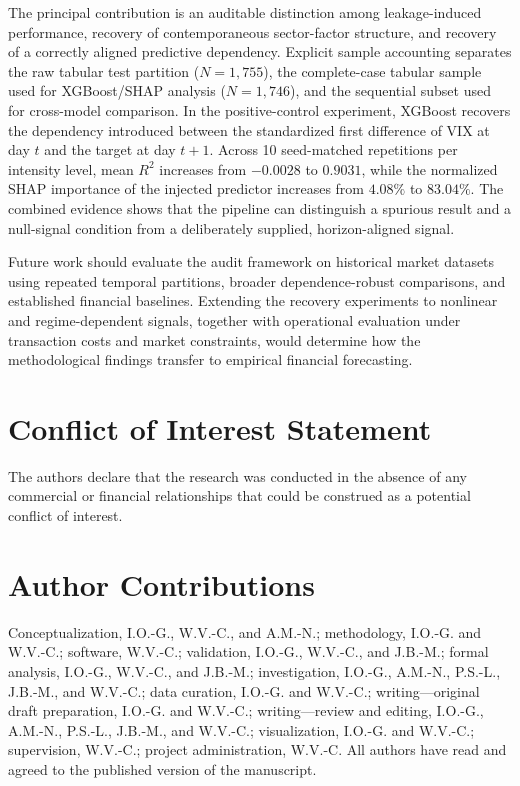 \documentclass[utf8]{FrontiersinHarvard} %
\begin{document}
The principal contribution is an auditable distinction among leakage-induced performance, recovery of contemporaneous sector-factor structure, and recovery of a correctly aligned predictive dependency. Explicit sample accounting separates the raw tabular test partition (\(N=1{,}755\)), the complete-case tabular sample used for XGBoost/SHAP analysis (\(N=1{,}746\)), and the sequential subset used for cross-model comparison. In the positive-control experiment, XGBoost recovers the dependency introduced between the standardized first difference of VIX at day \(t\) and the target at day \(t+1\). Across 10 seed-matched repetitions per intensity level, mean \(R^2\) increases from \(-0.0028\) to \(0.9031\), while the normalized SHAP importance of the injected predictor increases from \(4.08\%\) to \(83.04\%\). The combined evidence shows that the pipeline can distinguish a spurious result and a null-signal condition from a deliberately supplied, horizon-aligned signal.

Future work should evaluate the audit framework on historical market datasets using repeated temporal partitions, broader dependence-robust comparisons, and established financial baselines. Extending the recovery experiments to nonlinear and regime-dependent signals, together with operational evaluation under transaction costs and market constraints, would determine how the methodological findings transfer to empirical financial forecasting.

\section*{Conflict of Interest Statement}

The authors declare that the research was conducted in the absence of any commercial or financial relationships that could be construed as a potential conflict of interest.

\section*{Author Contributions}

Conceptualization, I.O.-G., W.V.-C., and A.M.-N.; methodology, I.O.-G. and W.V.-C.; software, W.V.-C.; validation, I.O.-G., W.V.-C., and J.B.-M.; formal analysis, I.O.-G., W.V.-C., and J.B.-M.; investigation, I.O.-G., A.M.-N., P.S.-L., J.B.-M., and W.V.-C.; data curation, I.O.-G. and W.V.-C.; writing---original draft preparation, I.O.-G. and W.V.-C.; writing---review and editing, I.O.-G., A.M.-N., P.S.-L., J.B.-M., and W.V.-C.; visualization, I.O.-G. and W.V.-C.; supervision, W.V.-C.; project administration, W.V.-C. All authors have read and agreed to the published version of the manuscript.
\end{document}
